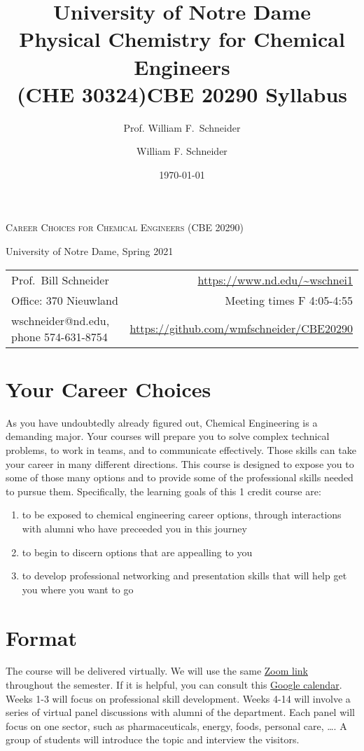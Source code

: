 \documentclass[11pt]{article}
\title{University of Notre Dame\\Physical Chemistry for Chemical Engineers\\(CHE 30324)}
\author{Prof. William F.\ Schneider}
\author{William F. Schneider}
\date{\today}
\title{CBE 20290  Syllabus}
\begin{document}
\begin{OPTIONS}
\end{OPTIONS}

\begin{center}
\textsc{Career Choices for Chemical Engineers (CBE 20290)}

University of Notre Dame, Spring 2021
\end{center}

\begin{center}
\begin{tabular}{lr}
\hline
Prof.~Bill Schneider & \url{https://www.nd.edu/\~wschnei1}\\
Office: 370 Nieuwland & Meeting times F 4:05-4:55\\
wschneider@nd.edu, phone 574-631-8754 & \url{https://github.com/wmfschneider/CBE20290}\\
\hline
\end{tabular}
\end{center}

\section{Your Career Choices}
\label{sec:org85e840a}
As you have undoubtedly already figured out, Chemical Engineering is a demanding major. Your courses will prepare you to solve complex technical problems, to work in teams, and to communicate effectively.  Those skills can take your career in many different directions. This course is designed to expose you to some of those many options and to provide some of the professional skills needed to pursue them. Specifically, the learning goals of this 1 credit course are:

\begin{enumerate}
\item to be exposed to chemical engineering career options, through interactions with alumni who have preceeded you in this journey
\item to begin to discern options that are appealling to you
\item to develop  professional networking and presentation skills that will help get you where you want to go
\end{enumerate}

\section{Format}
\label{sec:org2be67d8}
The course will be delivered virtually. We will use the same \href{https://notredame.zoom.us/j/91572218330?pwd=WFFvRW9DU3UvMHhXUTBwQUNIZzd0dz09}{Zoom link} throughout the semester. If it is helpful, you can consult this \href{https://calendar.google.com/calendar/u/0?cid=Y183NG02cDJnYWQ2NDQ4OTUzZGthaHJia2Nnc0Bncm91cC5jYWxlbmRhci5nb29nbGUuY29t}{Google calendar}.  Weeks 1-3 will focus on professional skill development. Weeks 4-14 will involve a series of virtual panel discussions with alumni of the department. Each panel will focus on one sector, such as pharmaceuticals, energy, foods, personal care, \ldots.  A group of students will introduce the topic and interview the visitors.
\end{document}
